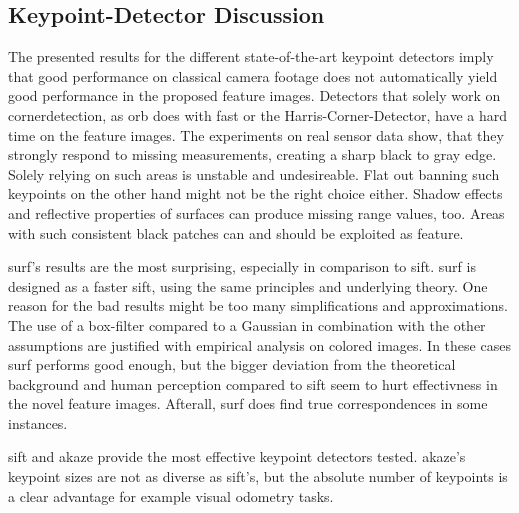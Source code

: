 \subsection{Keypoint-Detector Discussion}

The presented results for the different state-of-the-art keypoint detectors imply that good performance on classical camera footage does not automatically yield good performance in the proposed feature images.
Detectors that solely work on cornerdetection, as \acrshort{orb} does with \acrshort{fast} or the Harris-Corner-Detector, have a hard time on the feature images.
The experiments on real sensor data show, that they strongly respond to missing measurements, creating a sharp black to gray edge.
Solely relying on such areas is unstable and undesireable.
Flat out banning such keypoints on the other hand might not be the right choice either.
Shadow effects and reflective properties of surfaces can produce missing range values, too.
Areas with such consistent black patches can and should be exploited as feature.

\acrshort{surf}'s results are the most surprising, especially in comparison to \acrshort{sift}.
\acrshort{surf} is designed as a faster \acrshort{sift}, using the same principles and underlying theory.
One reason for the bad results might be too many simplifications and approximations.
The use of a box-filter compared to a Gaussian in combination with the other assumptions are justified with empirical analysis on colored images.
In these cases \acrshort{surf} performs good enough, but the bigger deviation from the theoretical background and human perception compared to \acrshort{sift} seem to hurt effectivness in the novel feature images.
Afterall, \acrshort{surf} does find true correspondences in some instances.

\acrshort{sift} and \acrshort{akaze} provide the most effective keypoint detectors tested.
\acrshort{akaze}'s keypoint sizes are not as diverse as \acrshort{sift}'s, but the absolute number of keypoints is a clear advantage for example visual odometry tasks.
